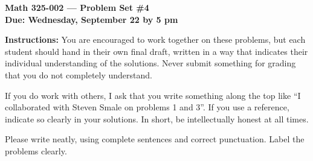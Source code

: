 \documentclass{amsart}
\begin{document}
\begin{center}
{\large\bfseries
Math 325-002 --- Problem Set \#4\\
Due: Wednesday, September 22 by 5 pm}
\end{center}





{\bf Instructions:} You are encouraged to work together on these
problems, but each student should hand in their own final draft,
written in a way that indicates their individual understanding of
the solutions. Never submit something for grading
that you do not completely understand. 

If you do work with others, I ask that you write something along the
top like ``I collaborated with Steven Smale on problems 1 and 3''.
If you use a reference, indicate so clearly in your solutions. 
In short, be intellectually
honest at all times.

Please write neatly, using complete sentences and correct
punctuation. Label the problems clearly. 
\end{document}
